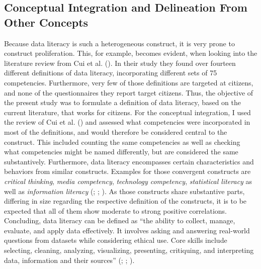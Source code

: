 \documentclass[
  12pt,
  a4paper,
  twoside]{article}
\begin{document}
\subsection{Conceptual Integration and Delineation From Other Concepts}\label{conceptual-integration-and-delineation-from-other-concepts}

Because data literacy is such a heterogeneous construct, it is very prone to construct proliferation. This, for example, becomes evident, when looking into the literature review from Cui et al. (). In their study they found over fourteen different definitions of data literacy, incorporating different sets of 75 competencies. Furthermore, very few of those definitions are targeted at citizens, and none of the questionnaires they report target citizens.
Thus, the objective of the present study was to formulate a definition of data literacy, based on the current literature, that works for citizens. For the conceptual integration, I used the review of Cui et al. () and assessed what competencies were incorporated in most of the definitions, and would therefore be considered central to the construct. This included counting the same competencies as well as checking what competencies might be named differently, but are considered the same substantively. Furthermore, data literacy encompasses certain characteristics and behaviors from similar constructs. Examples for those convergent constructs are \emph{critical thinking}, \emph{media competency}, \emph{technology competency}, \emph{statistical literacy} as well as \emph{information literacy} (; ; ). As those constructs share substantive parts, differing in size regarding the respective definition of the constructs, it is to be expected that all of them show moderate to strong positive correlations.
Concluding, data literacy can be defined as ``the ability to collect, manage, evaluate, and apply data effectively. It involves asking and answering real-world questions from datasets while considering ethical use. Core skills include selecting, cleaning, analyzing, visualizing, presenting, critiquing, and interpreting data, information and their sources'' (; ; ).
\end{document}
